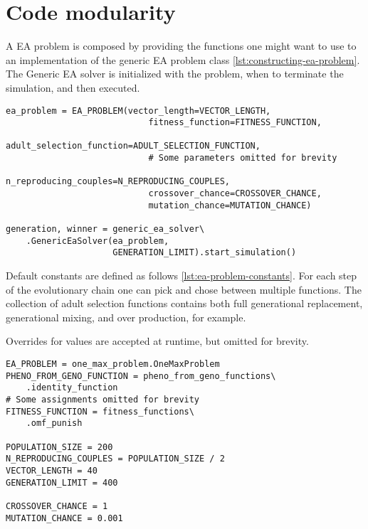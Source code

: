 \section{Code modularity}

A EA problem is composed by providing the functions one might want to use to an implementation of the generic EA problem class \ref{lst:constructing-ea-problem}. The Generic EA solver is initialized with the problem, when to terminate the simulation, and then executed.

\begin{lstlisting}[caption={constructing an ea problem}, label={lst:constructing-ea-problem}]
ea_problem = EA_PROBLEM(vector_length=VECTOR_LENGTH,
                            fitness_function=FITNESS_FUNCTION,
                            adult_selection_function=ADULT_SELECTION_FUNCTION,
                            # Some parameters omitted for brevity
                            n_reproducing_couples=N_REPRODUCING_COUPLES,
                            crossover_chance=CROSSOVER_CHANCE,
                            mutation_chance=MUTATION_CHANCE)

generation, winner = generic_ea_solver\
    .GenericEaSolver(ea_problem,
                     GENERATION_LIMIT).start_simulation()

\end{lstlisting}

Default constants are defined as follows \ref{lst:ea-problem-constants}. For each step of the evolutionary chain one can pick and chose between multiple functions. The collection of adult selection functions contains both full generational replacement, generational mixing, and over production, for example.

Overrides for values are accepted at runtime, but omitted for brevity.

\begin{lstlisting}[caption={Initial values for the EA problem}, label={lst:ea-problem-constants}]
EA_PROBLEM = one_max_problem.OneMaxProblem
PHENO_FROM_GENO_FUNCTION = pheno_from_geno_functions\
	.identity_function
# Some assignments omitted for brevity
FITNESS_FUNCTION = fitness_functions\
	.omf_punish

POPULATION_SIZE = 200
N_REPRODUCING_COUPLES = POPULATION_SIZE / 2
VECTOR_LENGTH = 40
GENERATION_LIMIT = 400

CROSSOVER_CHANCE = 1
MUTATION_CHANCE = 0.001

\end{lstlisting}
